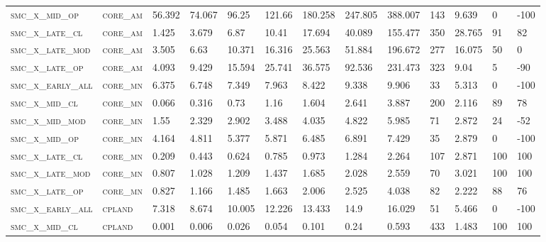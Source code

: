 \begin{landscape}
\begin{center}
\begin{footnotesize}
\begin{longtable}{lllllllllllll}
\textsc{smc\_x\_mid\_op   } & \textsc{core\_am  }   & 56.392   & 74.067   & 96.25    & 121.66   & 180.258  & 247.805  & 388.007  & 143 & 9.639    & 0   & -100   \\
\textsc{smc\_x\_late\_cl  } & \textsc{core\_am  }   & 1.425    & 3.679    & 6.87     & 10.41    & 17.694   & 40.089   & 155.477  & 350 & 28.765   & 91  & 82     \\
\textsc{smc\_x\_late\_mod } & \textsc{core\_am  }   & 3.505    & 6.63     & 10.371   & 16.316   & 25.563   & 51.884   & 196.672  & 277 & 16.075   & 50  & 0      \\
\textsc{smc\_x\_late\_op  } & \textsc{core\_am  }   & 4.093    & 9.429    & 15.594   & 25.741   & 36.575   & 92.536   & 231.473  & 323 & 9.04     & 5   & -90    \\
\textsc{smc\_x\_early\_all} & \textsc{core\_mn  }   & 6.375    & 6.748    & 7.349    & 7.963    & 8.422    & 9.338    & 9.906    & 33  & 5.313    & 0   & -100   \\
\textsc{smc\_x\_mid\_cl   } & \textsc{core\_mn  }   & 0.066    & 0.316    & 0.73     & 1.16     & 1.604    & 2.641    & 3.887    & 200 & 2.116    & 89  & 78     \\
\textsc{smc\_x\_mid\_mod  } & \textsc{core\_mn  }   & 1.55     & 2.329    & 2.902    & 3.488    & 4.035    & 4.822    & 5.985    & 71  & 2.872    & 24  & -52    \\
\textsc{smc\_x\_mid\_op   } & \textsc{core\_mn  }   & 4.164    & 4.811    & 5.377    & 5.871    & 6.485    & 6.891    & 7.429    & 35  & 2.879    & 0   & -100   \\
\textsc{smc\_x\_late\_cl  } & \textsc{core\_mn  }   & 0.209    & 0.443    & 0.624    & 0.785    & 0.973    & 1.284    & 2.264    & 107 & 2.871    & 100 & 100    \\
\textsc{smc\_x\_late\_mod } & \textsc{core\_mn  }   & 0.807    & 1.028    & 1.209    & 1.437    & 1.685    & 2.028    & 2.559    & 70  & 3.021    & 100 & 100    \\
\textsc{smc\_x\_late\_op  } & \textsc{core\_mn  }   & 0.827    & 1.166    & 1.485    & 1.663    & 2.006    & 2.525    & 4.038    & 82  & 2.222    & 88  & 76     \\
\textsc{smc\_x\_early\_all} & \textsc{cpland    }   & 7.318    & 8.674    & 10.005   & 12.226   & 13.433   & 14.9     & 16.029   & 51  & 5.466    & 0   & -100   \\
\textsc{smc\_x\_mid\_cl   } & \textsc{cpland    }   & 0.001    & 0.006    & 0.026    & 0.054    & 0.101    & 0.24     & 0.593    & 433 & 1.483    & 100 & 100    \\

\end{longtable}
\end{footnotesize}
\end{center}
\end{landscape}
